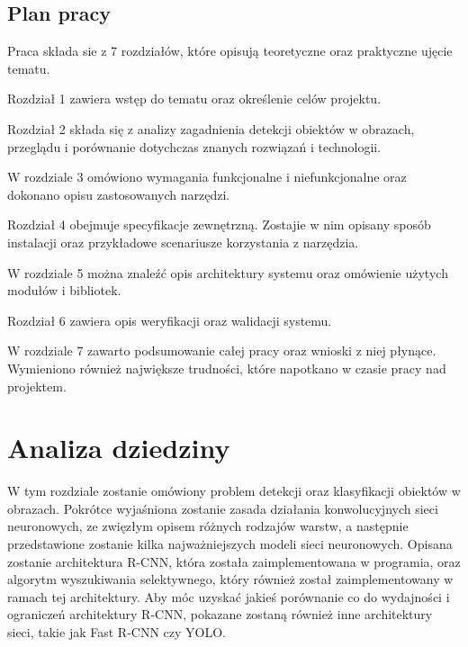 \documentclass[a4paper,twoside,12pt]{book}
\begin{document}
\section{Plan pracy}
{Praca składa sie z 7 rozdziałów, które opisują teoretyczne oraz praktyczne ujęcie tematu.}

{Rozdział 1 zawiera wstęp do tematu oraz określenie celów projektu.}

{Rozdział 2 składa się z analizy zagadnienia detekcji obiektów w obrazach, przeglądu i porównanie dotychczas znanych rozwiązań i technologii.}

{W rozdziale 3 omówiono wymagania funkcjonalne i niefunkcjonalne oraz dokonano opisu zastosowanych narzędzi.}

{Rozdział 4 obejmuje specyfikacje zewnętrzną. Zostajie w nim opisany sposób instalacji oraz przykładowe scenariusze korzystania z narzędzia.}

{W rozdziale 5 można znaleźć opis architektury systemu oraz omówienie użytych modułów i bibliotek.}

{Rozdział 6 zawiera opis weryfikacji oraz walidacji systemu.}

{W rozdziale 7 zawarto podsumowanie całej pracy oraz wnioski z niej płynące. Wymieniono również największe trudności, które napotkano w czasie pracy nad projektem.}



\chapter{Analiza dziedziny}
{W tym rozdziale zostanie omówiony problem detekcji oraz klasyfikacji obiektów w obrazach. Pokrótce wyjaśniona zostanie zasada działania konwolucyjnych sieci neuronowych, ze zwięzłym opisem różnych rodzajów warstw, a następnie przedstawione zostanie kilka najważniejszych modeli sieci neuronowych. Opisana zostanie architektura R-CNN, która została zaimplementowana w programia, oraz algorytm wyszukiwania selektywnego, który również został zaimplementowany w ramach tej architektury. Aby móc uzyskać jakieś porównanie co do wydajności i ograniczeń architektury R-CNN,  pokazane zostaną również inne architektury sieci, takie jak Fast R-CNN czy YOLO.}
\end{document}
